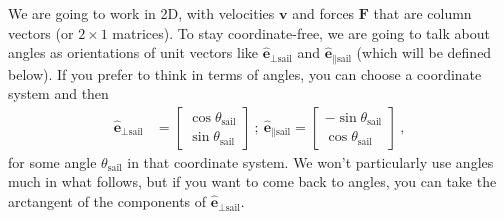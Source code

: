 \documentclass{article}
\renewcommand{\vec}[1]{\boldsymbol{#1}}
\newcommand{\uvec}{\vec{\hat{e}}}
\newcommand{\sail}{\text{sail}}
\begin{document}
We are going to work in 2D, with velocities $\vec{v}$ and forces $\vec{F}$ that are column vectors (or $2\times 1$ matrices).
To stay coordinate-free, we are going to talk about angles as orientations of unit vectors like $\uvec_{\perp\sail}$ and $\uvec_{\parallel\sail}$ (which will be defined below).
If you prefer to think in terms of angles, you can choose a coordinate system and then
\begin{align}
    \uvec_{\perp\sail} &= \begin{bmatrix}\cos\theta_\sail \\ \sin\theta_\sail\end{bmatrix} ~ ; ~ \uvec_{\parallel\sail} = \begin{bmatrix}-\sin\theta_\sail \\ \cos\theta_\sail\end{bmatrix} ~,
\end{align}
for some angle $\theta_\sail$ in that coordinate system.
We won't particularly use angles much in what follows, but if you want to come back to angles, you can take the arctangent of the components of $\uvec_{\perp\sail}$.
\end{document}
